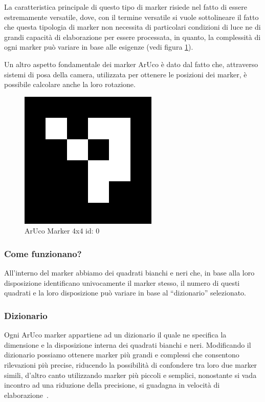 \documentclass[12pt,a4paper,openright,twoside]{book}
\begin{document}
La caratteristica principale di questo tipo di marker risiede nel fatto di essere estremamente versatile, dove,
con il termine versatile si vuole sottolineare il fatto che questa tipologia di marker non necessita di particolari condizioni di luce ne di grandi capacità di elaborazione per essere processata, in quanto, la complessità di ogni marker può variare in base alle esigenze (vedi figura \ref{fig:aruco_marker_0}).

Un altro aspetto fondamentale dei marker ArUco è dato dal fatto che, attraverso sistemi di posa della camera, utilizzata per ottenere le posizioni dei marker, è possibile calcolare anche la loro rotazione.

\begin{figure}[h!]
	\centering
	\includegraphics[width=0.4\linewidth]{./figures/4x4_1000-0.png}
	\caption{ArUco Marker 4x4 id: 0}
	\label{fig:aruco_marker_0}
\end{figure}

\subsubsection{Come funzionano?}
All'interno del marker abbiamo dei quadrati bianchi e neri che, in base alla loro disposizione identificano univocamente il marker stesso, il numero di questi quadrati e la loro disposizione può variare in base al ``dizionario'' selezionato.

\subsubsection{Dizionario} \label{subsubsec:dizionario}
Ogni ArUco marker appartiene ad un dizionario il quale ne specifica la dimensione e la disposizione interna dei quadrati bianchi e neri. Modificando il dizionario possiamo ottenere marker più grandi e complessi che consentono rilevazioni più precise, riducendo la possibilità di confondere tra loro due marker simili, d'altro canto utilizzando marker più piccoli e semplici, nonostante si vada incontro ad una riduzione della precisione, si guadagna in velocità di elaborazione~\cite{reverseEngineeringArucoMarkers}.
 
\end{document}
